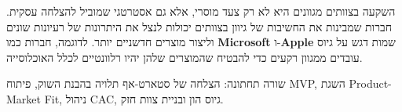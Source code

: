 השקעה בצוותים מגוונים היא לא רק צעד מוסרי, אלא גם אסטרטגי שמוביל להצלחה עסקית. חברות שמבינות את החשיבות של גיוון בצוותים יכולות לנצל את היתרונות של רעיונות שונים וליצור מוצרים חדשניים יותר. לדוגמה, חברות כמו \textbf{Microsoft} ו-\textbf{Apple} שמות דגש על גיוס עובדים ממגוון רקעים כדי להבטיח שהמוצרים שלהן יהיו רלוונטיים לכלל האוכלוסייה.

\begin{takeaway}
שורה תחתונה: הצלחה של סטארט-אף תלויה בהבנת השוק, פיתוח MVP, השגת Product-Market Fit, ניהול CAC, גיוס הון ובניית צוות חזק.
\end{takeaway}
